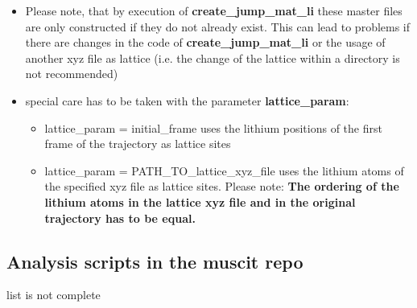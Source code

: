 \documentclass{article}
\begin{document}
\begin{itemize}
\begin{itemize}
\end{itemize}
 \item Please note, that by execution of  \textbf{create\_jump\_mat\_li}  these master files are only constructed if they do not already exist. This can lead to problems if there are changes in the code of \textbf{create\_jump\_mat\_li} or the usage of another xyz file as lattice (i.e. the change of the lattice within a directory is not recommended)
 \item special care has to be taken with the parameter \textbf{lattice\_param}: 
  \begin{itemize}
 \item lattice\_param = initial\_frame uses the lithium positions of the first frame of the trajectory as lattice sites
 \item  lattice\_param = PATH\_TO\_lattice\_xyz\_file uses the lithium atoms of the specified xyz file as lattice sites. Please note: \textbf{The ordering of the lithium atoms in the lattice xyz file and in the original trajectory has to be equal.}
 \end{itemize}
%
%
\end{itemize}

%

%
%
%
%
%
%
%
%
%
%
%
%
%
%
%
%
%
%
%
%
%
%


%
%
%
%
%
%
%
%
%
%
%
%
%
%
%
%
%
%
%
%
%
%
%
%
%
%
%
%






\subsection{Analysis scripts in the muscit repo}
list is not complete
\end{document}
